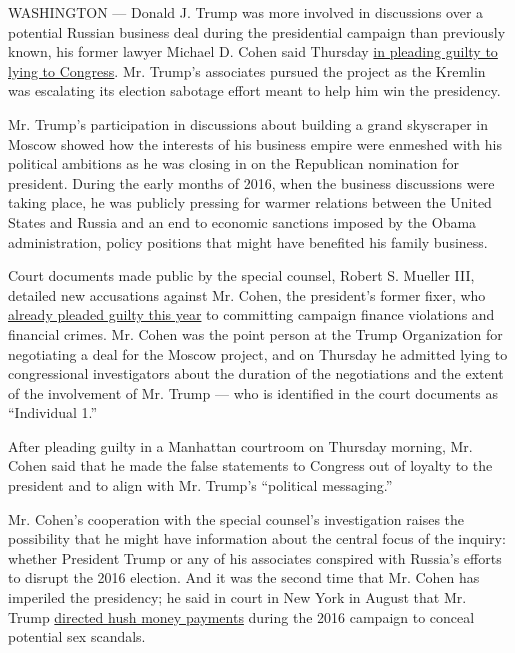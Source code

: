 WASHINGTON --- Donald J. Trump was more involved in discussions over a
potential Russian business deal during the presidential campaign than
previously known, his former lawyer Michael D. Cohen said Thursday
\href{https://int.nyt.com/data/documenthelper/501-michael-cohen-court-transcript/ddd84d2b0f5a3425ebc5/optimized/full.pdf\#page=1}{in
pleading guilty to lying to Congress}. Mr. Trump's associates pursued
the project as the Kremlin was escalating its election sabotage effort
meant to help him win the presidency.

Mr. Trump's participation in discussions about building a grand
skyscraper in Moscow showed how the interests of his business empire
were enmeshed with his political ambitions as he was closing in on the
Republican nomination for president. During the early months of 2016,
when the business discussions were taking place, he was publicly
pressing for warmer relations between the United States and Russia and
an end to economic sanctions imposed by the Obama administration, policy
positions that might have benefited his family business.

Court documents made public by the special counsel, Robert S. Mueller
III, detailed new accusations against Mr. Cohen, the president's former
fixer, who
\href{https://www.nytimes.com/2018/08/21/nyregion/michael-cohen-guilty-plea-trump-takeaways.html}{already
pleaded guilty this year} to committing campaign finance violations and
financial crimes. Mr. Cohen was the point person at the Trump
Organization for negotiating a deal for the Moscow project, and on
Thursday he admitted lying to congressional investigators about the
duration of the negotiations and the extent of the involvement of Mr.
Trump --- who is identified in the court documents as ``Individual 1.''

After pleading guilty in a Manhattan courtroom on Thursday morning, Mr.
Cohen said that he made the false statements to Congress out of loyalty
to the president and to align with Mr. Trump's ``political messaging.''

Mr. Cohen's cooperation with the special counsel's investigation raises
the possibility that he might have information about the central focus
of the inquiry: whether President Trump or any of his associates
conspired with Russia's efforts to disrupt the 2016 election. And it was
the second time that Mr. Cohen has imperiled the presidency; he said in
court in New York in August that Mr. Trump
\href{https://www.nytimes.com/2018/08/21/nyregion/michael-cohen-plea-deal-trump.html}{directed
hush money payments} during the 2016 campaign to conceal potential sex
scandals.

